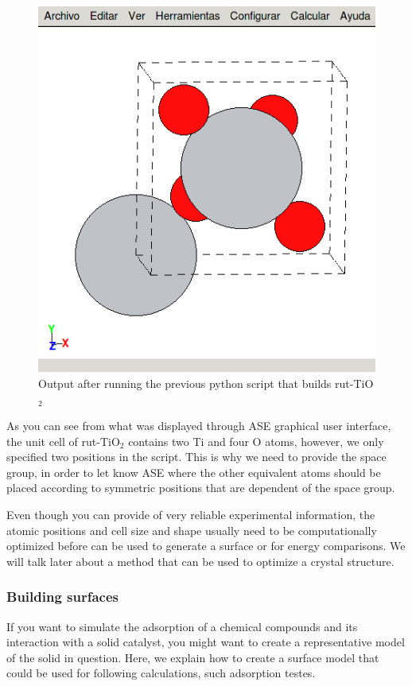 \documentclass[11pt]{article}
\begin{document}
\begin{figure}[htbp]
\centering
\includegraphics[width=.9\linewidth]{./figures/rut-TiO2-ase-ex.png}
\caption{Output after running the previous python script that builds rut-TiO\(_{\text{2}}\)}
\end{figure}

As you can see from what was displayed through ASE graphical user interface, the unit cell of rut-TiO\(_{\text{2}}\) contains two Ti and four O atoms, however, we only specified two positions in the script. This is why we need to provide the space group, in order to let know ASE where the other equivalent atoms should be placed according to symmetric positions that are dependent of the space group.

Even though you can provide of very reliable experimental information, the atomic positions and cell size and shape usually need to be computationally optimized before can be used to generate a surface or for energy comparisons. We will talk later about a method that can be used to optimize a crystal structure.  

\subsubsection{Building surfaces}
\label{sec:org10534d0}
If you want to simulate the adsorption of a chemical compounds and its interaction with a solid catalyst, you might want to create a representative model of the solid in question. Here, we explain how to create a surface model that could be used for following calculations, such adsorption testes. 
\end{document}
